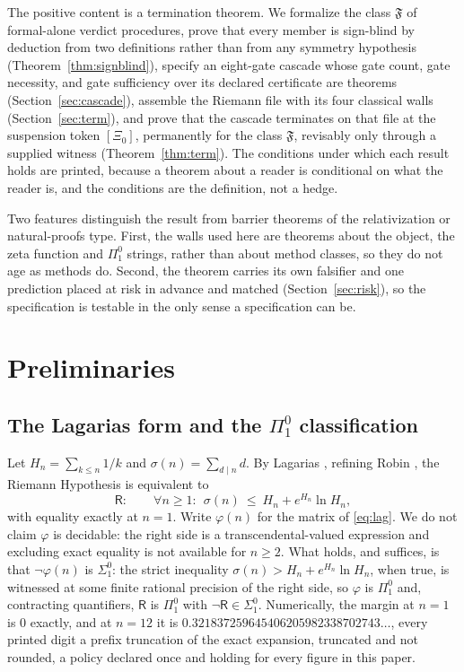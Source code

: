 \documentclass[twocolumn,10pt]{article}
\theoremstyle{plain}
\theoremstyle{definition}
\newcommand{\tXi}{[\Xi_0]}
\newcommand{\R}{\mathsf{R}}
\newcommand{\Fr}{\mathfrak{F}}
\begin{document}
The positive content is a termination theorem. We formalize the class $\Fr$ of formal-alone verdict procedures, prove that every member is sign-blind by deduction from two definitions rather than from any symmetry hypothesis (Theorem~\ref{thm:signblind}), specify an eight-gate cascade whose gate count, gate necessity, and gate sufficiency over its declared certificate are theorems (Section~\ref{sec:cascade}), assemble the Riemann file with its four classical walls (Section~\ref{sec:term}), and prove that the cascade terminates on that file at the suspension token $\tXi$, permanently for the class $\Fr$, revisably only through a supplied witness (Theorem~\ref{thm:term}). The conditions under which each result holds are printed, because a theorem about a reader is conditional on what the reader is, and the conditions are the definition, not a hedge.

Two features distinguish the result from barrier theorems of the relativization or natural-proofs type. First, the walls used here are theorems about the object, the zeta function and $\Pi^0_1$ strings, rather than about method classes, so they do not age as methods do. Second, the theorem carries its own falsifier and one prediction placed at risk in advance and matched (Section~\ref{sec:risk}), so the specification is testable in the only sense a specification can be.

\section{Preliminaries}\label{sec:prelim}

\subsection{The Lagarias form and the $\Pi^0_1$ classification}\label{ssec:lagarias}
Let $H_n=\sum_{k\le n}1/k$ and $\sigma(n)=\sum_{d\mid n}d$. By Lagarias \cite{Lagarias2002}, refining Robin \cite{Robin1984}, the Riemann Hypothesis is equivalent to
\begin{equation}\label{eq:lag}
\R:\qquad \forall n\ge 1:\ \ \sigma(n)\ \le\ H_n+e^{H_n}\ln H_n ,
\end{equation}
with equality exactly at $n=1$. Write $\varphi(n)$ for the matrix of \eqref{eq:lag}. We do not claim $\varphi$ is decidable: the right side is a transcendental-valued expression and excluding exact equality is not available for $n\ge2$. What holds, and suffices, is that $\neg\varphi(n)$ is $\Sigma^0_1$: the strict inequality $\sigma(n)>H_n+e^{H_n}\ln H_n$, when true, is witnessed at some finite rational precision of the right side, so $\varphi$ is $\Pi^0_1$ and, contracting quantifiers, $\R$ is $\Pi^0_1$ with $\neg\R\in\Sigma^0_1$. Numerically, the margin at $n=1$ is $0$ exactly, and at $n=12$ it is $0.321837259645406205982338702743\ldots$, every printed digit a prefix truncation of the exact expansion, truncated and not rounded, a policy declared once and holding for every figure in this paper.
\end{document}
